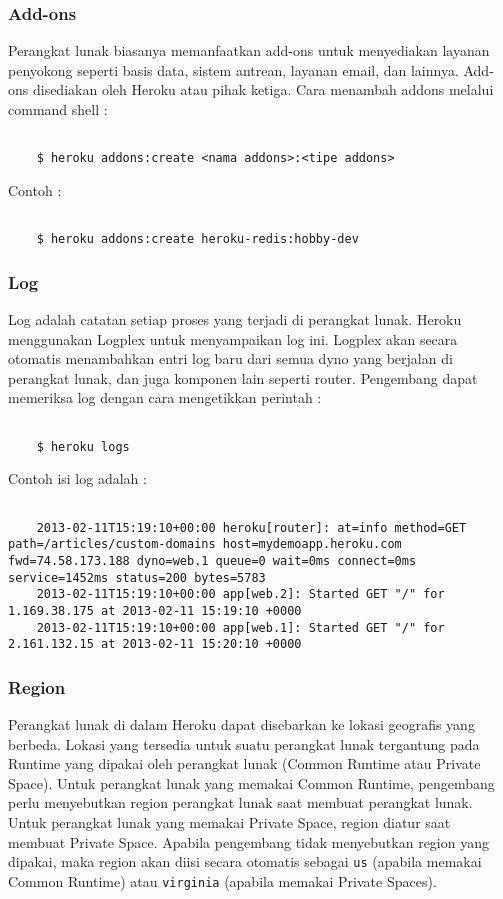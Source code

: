 \subsubsection{Add-ons}
Perangkat lunak biasanya memanfaatkan add-ons untuk menyediakan layanan penyokong seperti basis data, sistem antrean, layanan email, dan lainnya. Add-ons disediakan oleh Heroku atau pihak ketiga. Cara menambah addons melalui command shell :
\begin{lstlisting}

	$ heroku addons:create <nama addons>:<tipe addons>

\end{lstlisting}
Contoh :
\begin{lstlisting}

	$ heroku addons:create heroku-redis:hobby-dev

\end{lstlisting}

\subsubsection{Log}
Log adalah catatan setiap proses yang terjadi di perangkat lunak. Heroku menggunakan Logplex untuk menyampaikan log ini. Logplex akan secara otomatis menambahkan entri log baru dari semua dyno yang berjalan di perangkat lunak, dan juga komponen lain seperti router. Pengembang dapat memeriksa log dengan cara mengetikkan perintah :
\begin{lstlisting}

	$ heroku logs

\end{lstlisting}
Contoh isi log adalah :
\begin{lstlisting}

	2013-02-11T15:19:10+00:00 heroku[router]: at=info method=GET path=/articles/custom-domains host=mydemoapp.heroku.com fwd=74.58.173.188 dyno=web.1 queue=0 wait=0ms connect=0ms service=1452ms status=200 bytes=5783
	2013-02-11T15:19:10+00:00 app[web.2]: Started GET "/" for 1.169.38.175 at 2013-02-11 15:19:10 +0000
	2013-02-11T15:19:10+00:00 app[web.1]: Started GET "/" for 2.161.132.15 at 2013-02-11 15:20:10 +0000

\end{lstlisting}

\subsubsection{Region}
Perangkat lunak di dalam Heroku dapat disebarkan ke lokasi geografis yang berbeda. Lokasi yang tersedia untuk suatu perangkat lunak tergantung pada Runtime yang dipakai oleh perangkat lunak (Common Runtime atau Private Space). Untuk perangkat lunak yang memakai Common Runtime, pengembang perlu menyebutkan region perangkat lunak saat membuat perangkat lunak. Untuk perangkat lunak yang memakai Private Space, region diatur saat membuat Private Space. Apabila pengembang tidak menyebutkan region yang dipakai, maka region akan diisi secara otomatis sebagai \texttt{us} (apabila memakai Common Runtime) atau \texttt{virginia} (apabila memakai Private Spaces).

